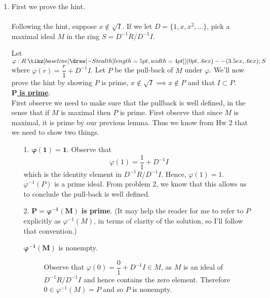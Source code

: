 \documentclass[12pt,letterpaper]{algebra_book}
\renewcommand{\to}{\mathbin{\tikz[baseline] \draw[-{Stealth[length=5pt,width=4pt]}] (0pt,.6ex) -- (3.5ex,.6ex);}}
\renewcommand{\phi}{\varphi}
\theoremstyle{definition}
\begin{document}
\begin{prf}
\begin{enumerate}
            \item 
            First we prove the hint. 
            \\
            \\
            Following the hint, suppose $x \not\in \sqrt{I}$. If we
            let $D = \{1, x, x^2, \dots\}$, pick a maximal ideal $M$ in
            the ring $S = D^{-1}R/D^{-1}I$. 
    
            Let $\phi: R \to S$ where $\phi(r) = \dfrac{r}{1} + D^{-1}I$.
            Let $P$ be the pull-back of $M$ under $\phi$. 
            We'll now prove the hint by showing $P$ is prime, $x \not\in
            \sqrt{I} \implies x \not\in P$ and that $I \subset P$.
            \\[1.2ex]
            \underline{$\bm{P}$ \textbf{is prime}}.\\[1.2ex]
            First observe we need to make sure that the pullback is well
            defined, in the sense that 
            if $M$ is maximal then $P$ is prime. First observe that since
            $M$ is maximal, it is prime by our previous lemma. Thus we
            know from Hw 2 
            that we need to show two things.
            \begin{itemize}
                \item[1.] $\bm{\phi(1) = 1}.$ Observe that 
                \[
                    \phi(1) = \dfrac{1}{1} + D^{-1}I   
                \] 
                which is the identity element in $D^{-1}R/D^{-1}I$. Hence,
                $\phi(1) = 1$. 
                $\phi^{-1}(P)$ is a prime ideal. From problem 2, we know
                that this allows us to conclude the pull-back is well defined.
    
                \item[2.] $\bm{P = \phi^{-1}(M)}$ \textbf{is prime}. (It
                may help the reader for me to refer to $P$ explicitly as
                $\phi^{-1}(M)$, in terms of clarity of the solution, so
                I'll follow that convention.)
                \begin{description}
                    \item[$\bm{\phi^{-1}(M)}$ is nonempty.]
                    Observe that $\phi(0) = \dfrac{0}{1} + D^{-1}I \in M$,
                    as $M$ is an ideal of $D^{-1}R/D^{-1}I$ and hence
                    contains the zero element. Therefore $0 \in
                    \phi^{-1}(M) = P$ and so
                    $P$ is nonempty. 
                    

\end{description}
\end{itemize}
\end{enumerate}
\end{prf}
\end{document}
